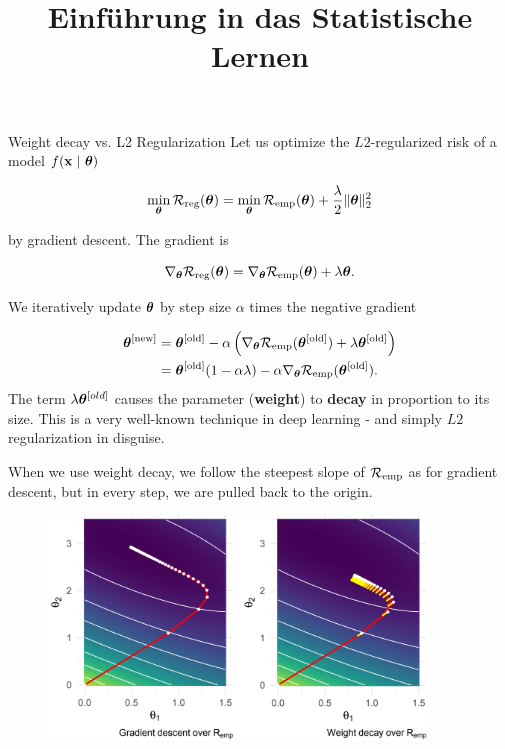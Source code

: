 



\newcommand{\titlefigure}{figure_man/L2-regularization01.png}
\newcommand{\learninggoals}{
  \item Have a geometric understanding of $L2$ regularization
  \item Understand why $L2$ regularization in combination with gradient descent is called weight decay
}

\title{Einführung in das Statistische Lernen}
\date{}






\begin{vbframe}{Weight decay vs. L2 Regularization}
Let us optimize the $L2$-regularized risk of a model $f(\mathbf{x} ~|~ \bm{\theta})$

\[
\min_{\bm{\theta}} \mathcal{R}_{\text{reg}}(\bm{\theta}) = \min_{\bm{\theta}} \mathcal{R}_{\text{emp}}(\bm{\theta}) + \frac{\lambda}{2} \|\bm{\theta}\|^2_2
\]

by gradient descent. The gradient is

\[
\nabla_{\bm{\theta}} \mathcal{R}_{\text{reg}}(\bm{\theta}) = \nabla_{\bm{\theta}} \mathcal{R}_{\text{emp}}(\bm{\theta}) + \lambda \bm{\theta}.
\]

We iteratively update $\bm{\theta}$ by step size \(\alpha\) times the
negative gradient

\begin{align*}
\bm{\theta}^{[\text{new}]} &= \bm{\theta}^{[\text{old}]} - \alpha \left(\nabla_{\bm{\theta}} \mathcal{R}_{\text{emp}}(\bm{\theta}^{[\text{old}]}) + \lambda \bm{\theta}^{[\text{old}]}\right) \\&=
\bm{\theta}^{[\text{old}]} (1 - \alpha \lambda) - \alpha \nabla_{\bm{\theta}} \mathcal{R}_{\text{emp}}(\bm{\theta}^{[\text{old}]}).
\end{align*}
The term \(\lambda \bm{\theta}^{[old]}\) causes the parameter
(\textbf{weight}) to \textbf{decay} in proportion to its size. This is a very well-known technique in deep learning - and simply $L2$ regularization in disguise.

\framebreak

When we use weight decay, we follow the steepest slope of $\mathcal{R}_{\text{emp}}$ as for gradient descent, but in every step, we are pulled back to the origin.

\begin{figure}
\includegraphics[width=0.9\textwidth]{figure_man/L2-regularization01.png}\\
\end{figure}



\end{vbframe}
